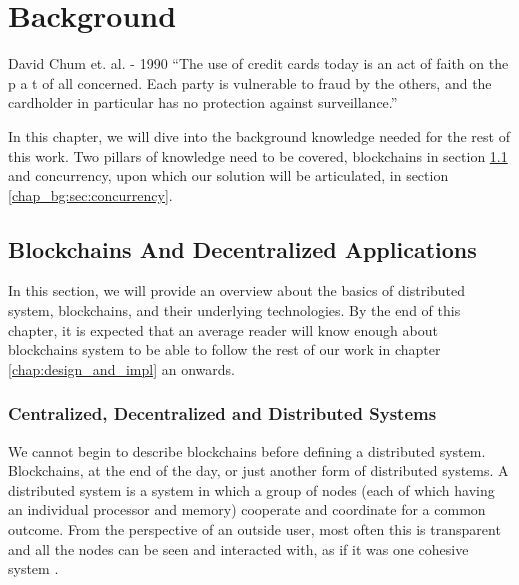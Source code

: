 \chapter{Background} \label{chap:background}


\ifpdf
    \graphicspath{{7/figures/PNG/}{7/figures/PDF/}{7/figures/}}
\else
    \graphicspath{{7/figures/EPS/}{7/figures/}}
\fi
%

\begin{chapquote}{David Chum et. al. - 1990}
``The use of credit cards today is an act of faith on the p a t of all concerned. Each party is
vulnerable to fraud by the others, and the cardholder in particular has no protection against
surveillance.''
\end{chapquote}


In this chapter, we will dive into the background knowledge needed for the rest of this work. Two
pillars of knowledge need to be covered, blockchains in section \ref{chap_bg:sec:blockchains} and
concurrency, upon which our solution will be articulated, in section \ref{chap_bg:sec:concurrency}.

\section{Blockchains And Decentralized Applications} \label{chap_bg:sec:blockchains}

In this section, we will provide an overview about the basics of distributed system, blockchains,
and their underlying technologies. By the end of this chapter, it is expected that an average reader
will know enough about blockchains system to be able to follow the rest of our work in chapter
\ref{chap:design_and_impl} an onwards.

\subsection{Centralized, Decentralized and Distributed Systems}

We cannot begin to describe blockchains before defining a distributed system. Blockchains, at the
end of the day, or just another form of distributed systems. A distributed system is a system in
which a group of nodes (each of which having an individual processor and memory) cooperate and
coordinate for a common outcome. From the perspective of an outside user, most often this is
transparent and all the nodes can be seen and interacted with, as if it was one cohesive system
\cite{mastering_blockchain}.

